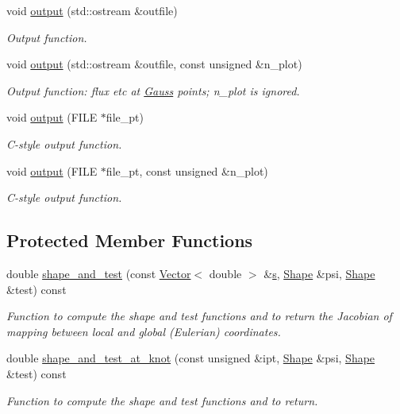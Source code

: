 \begin{DoxyCompactItemize}
void \hyperlink{classoomph_1_1HelmholtzFluxFromNormalDisplacementBCElement_a778e21256d01c8b51e4d9ab8e5767d5f}{output} (std\+::ostream \&outfile)
\begin{DoxyCompactList}\small\item\em Output function. \end{DoxyCompactList}\item 
void \hyperlink{classoomph_1_1HelmholtzFluxFromNormalDisplacementBCElement_aec87ba2999b0c2e58447ca490b987c0e}{output} (std\+::ostream \&outfile, const unsigned \&n\+\_\+plot)
\begin{DoxyCompactList}\small\item\em Output function\+: flux etc at \hyperlink{classoomph_1_1Gauss}{Gauss} points; n\+\_\+plot is ignored. \end{DoxyCompactList}\item 
void \hyperlink{classoomph_1_1HelmholtzFluxFromNormalDisplacementBCElement_ae75706159d926cbad94fe66fa607b1fe}{output} (F\+I\+LE $\ast$file\+\_\+pt)
\begin{DoxyCompactList}\small\item\em C-\/style output function. \end{DoxyCompactList}\item 
void \hyperlink{classoomph_1_1HelmholtzFluxFromNormalDisplacementBCElement_a3a08931249b5071b11ec8082848cc94e}{output} (F\+I\+LE $\ast$file\+\_\+pt, const unsigned \&n\+\_\+plot)
\begin{DoxyCompactList}\small\item\em C-\/style output function. \end{DoxyCompactList}\end{DoxyCompactItemize}
\subsection*{Protected Member Functions}
\begin{DoxyCompactItemize}
\item 
double \hyperlink{classoomph_1_1HelmholtzFluxFromNormalDisplacementBCElement_a91ee0e36a8c127d83269a08d6740dfb2}{shape\+\_\+and\+\_\+test} (const \hyperlink{classoomph_1_1Vector}{Vector}$<$ double $>$ \&\hyperlink{cfortran_8h_ab7123126e4885ef647dd9c6e3807a21c}{s}, \hyperlink{classoomph_1_1Shape}{Shape} \&psi, \hyperlink{classoomph_1_1Shape}{Shape} \&test) const
\begin{DoxyCompactList}\small\item\em Function to compute the shape and test functions and to return the Jacobian of mapping between local and global (Eulerian) coordinates. \end{DoxyCompactList}\item 
double \hyperlink{classoomph_1_1HelmholtzFluxFromNormalDisplacementBCElement_ad3a879cf569b317c086f07872164f9f8}{shape\+\_\+and\+\_\+test\+\_\+at\+\_\+knot} (const unsigned \&ipt, \hyperlink{classoomph_1_1Shape}{Shape} \&psi, \hyperlink{classoomph_1_1Shape}{Shape} \&test) const
\begin{DoxyCompactList}\small\item\em Function to compute the shape and test functions and to return. \end{DoxyCompactList}\end{DoxyCompactItemize}
